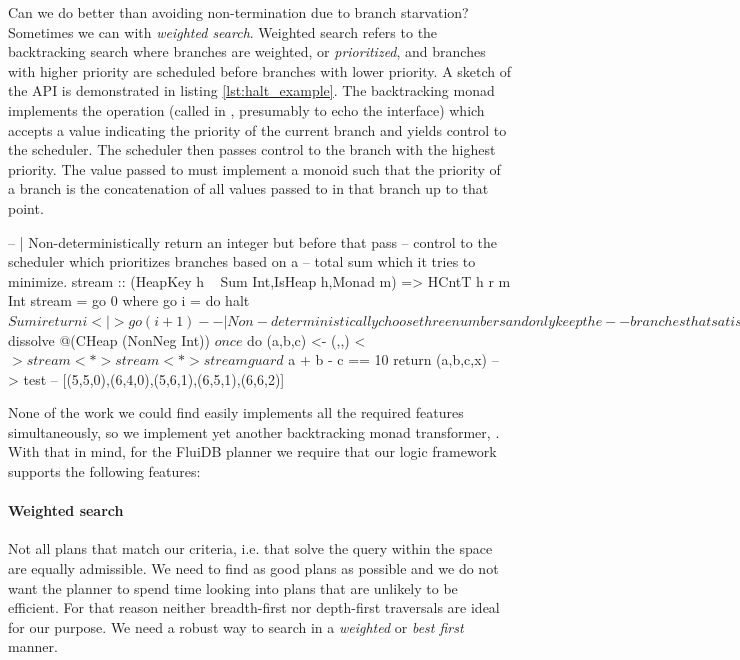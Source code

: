 Can we do better than avoiding non-termination due to branch starvation?
Sometimes we can with \emph{weighted search}. Weighted search refers
to the backtracking search where branches are weighted, or
\emph{prioritized}, and branches with higher priority are scheduled
before branches with lower priority. A sketch of the API is
demonstrated in listing \ref{lst:halt_example}. The backtracking monad
implements the  operation (called  in
\cite{kidneyAlgebrasWeightedSearch2021}, presumably to echo the
 interface) which accepts a value indicating the
priority of the current branch and yields control to the
scheduler. The scheduler then passes control to the branch with the
highest priority. The value passed to  must implement a
monoid such that the priority of a branch is the concatenation of all
values passed to  in that branch up to that point.

\begin{code}
\begin{haskellcode}
  -- | Non-deterministically return an integer but before that pass
  -- control to the scheduler which prioritizes branches based on a
  -- total sum which it tries to minimize.
  stream :: (HeapKey h ~ Sum Int,IsHeap h,Monad m) => HCntT h r m Int
  stream = go 0 where
    go i = do
      halt $ Sum i
      return i <|> go (i+1)

  -- | Non-deterministically choose three numbers and only keep the
  -- branches that satisfy a + b - c == 10. Avoid diverging by preferring
  -- branches for which the sum of the numbers is minimum.
  test2 :: IO [(Int,Int,Int)]
  test2 = takeListT 5 $ dissolve @(CHeap (NonNeg Int)) $ once $ do
    (a,b,c) <- (,,) <$> stream <*> stream <*> stream
    guard $ a + b - c == 10
    return (a,b,c,x)
  -- > test
  -- [(5,5,0),(6,4,0),(5,6,1),(6,5,1),(6,6,2)]
\end{haskellcode}
  \caption{\label{lst:halt_example}Prioritise branches that we want to
    be executed first.}
\end{code}

None of the work we could find easily implements all the required
features simultaneously, so we implement yet another backtracking monad
transformer, . With that in mind, for the FluiDB planner
we require that our logic framework supports the following features:

\paragraph{Weighted search}
Not all plans that match our criteria, i.e. that
solve the query within the space are equally admissible. We need to
find as good plans as possible and we do not want the planner to spend
time looking into plans that are unlikely to be efficient. For that
reason neither breadth-first nor depth-first traversals are ideal for
our purpose. We need a robust way to search in a \emph{weighted} or \emph{best first} manner.

